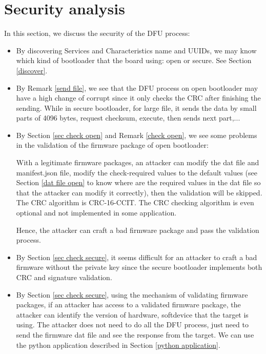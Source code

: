 \documentclass{article}
\theoremstyle{plain}
\theoremstyle{definition}
\numberwithin{equation}{section}
\begin{document}
\section{Security analysis}\label{security}
In this section, we discuss the security of the DFU process:
\begin{itemize}
	\item By discovering Services and Characteristics name and UUIDs, we may know which kind of bootloader that the board using: open or secure. See Section \ref{discover}.
	\item By Remark \ref{send file}, we see that the DFU process on open bootloader may have a high change of corrupt since it only checks the CRC after finishing the sending. While in secure bootloader, for large file, it sends the data by small parts of 4096 bytes, request checksum, execute, then sends next part,...
	\item By  Section \ref{sec check open} and Remark \ref{check open}, we see some problems in the validation of the firmware package of open bootloader:
	
	With a legitimate firmware packages, an attacker can modify the dat file and manifest.json file, modify the check-required  values to the default values (see Section \ref{dat file open} to know where are the required values in the dat file so that the attacker can modify it correctly), then the validation will be skipped. The CRC algorithm is CRC-16-CCIT. The CRC checking algorithm is even optional and not implemented in some application.
	
	Hence, the attacker can craft a bad firmware package and pass the validation process.
	
	\item By Section \ref{sec check secure}, it seems difficult for an attacker to craft a bad firmware without the private key since the secure bootloader implements both CRC and signature validation.
	
	\item By Section \ref{sec check secure}, using the mechanism of validating firmware packages, if an attacker has access to a validated firmware package, the attacker can identify the version of hardware, softdevice that the target is using. The attacker does not need to do all the DFU process, just need to send the firmware dat file and see the response from the target. We can use the python application described in Section \ref{python application}.
\end{itemize}
\end{document}
